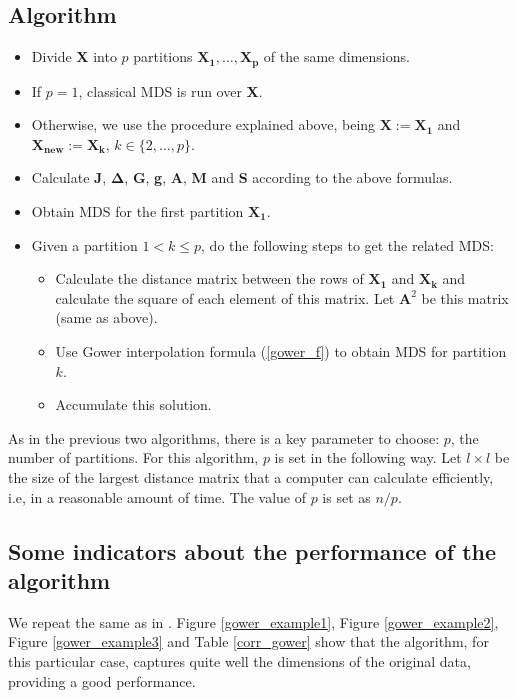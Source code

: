 \documentclass[11pt]{report}
\begin{document}
\subsection{Algorithm}

\begin{itemize}
\item Divide \textbf{X} into $p$ partitions $\mathbf{X_1},\dots, \mathbf{X_p}$
of the same dimensions.

\item If $p=1$, classical MDS is run over \textbf{X}.

\item Otherwise, we use the procedure explained above, 
being $\mathbf{X} := \mathbf{X_1}$ and 
$\mathbf{X_{new}} := \mathbf{X_k}$, $k \in \{2, \dots, p\}$.

\item Calculate \textbf{J}, $\mathbf{\Delta}$, \textbf{G}, \textbf{g},
\textbf{A}, \textbf{M} and \textbf{S} according to the above formulas.

\item Obtain MDS for the first partition $\mathbf{X_1}$. 

\item Given a partition $1 < k \leq p$, do the following steps to get the 
related MDS:

\begin{itemize}

\item Calculate the distance matrix between the rows of $\mathbf{X_1}$ and
$\mathbf{X_k}$ and calculate the square of each element of this matrix. Let
$\mathbf{A}^2$ be this matrix (same as above).

\item Use Gower interpolation formula (\ref{gower_f}) to obtain MDS for 
partition $k$. 

\item Accumulate this solution.


\end{itemize}

\end{itemize}


As in the previous two algorithms, there is a key parameter to choose: $p$,
the number of partitions. For this algorithm, $p$ is set in the following way.
Let $l \times l$ be the size of the largest distance matrix that a computer can 
calculate efficiently, i.e, in a reasonable amount of time. The value of 
$p$ is set as $n/p$.


\subsection{Some indicators about the performance of the algorithm}
We repeat the same as in . Figure \ref{gower_example1},
Figure \ref{gower_example2}, Figure \ref{gower_example3} and 
Table \ref{corr_gower} show that the algorithm, for this particular case, 
captures quite well the dimensions of the original data, providing a 
good performance.
\end{document}
